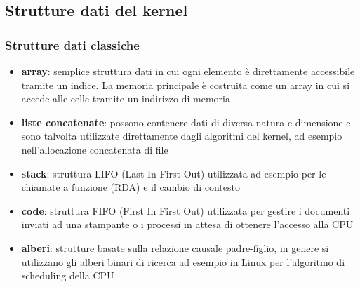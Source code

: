 \documentclass[a4paper]{article}
\begin{document}

\subsection{Strutture dati del kernel}
\subsubsection*{Strutture dati classiche}
\begin{itemize}
	\item \textbf{array}: semplice struttura dati in cui ogni elemento è direttamente accessibile tramite un indice. La
	memoria principale è costruita come un array in cui si accede alle celle tramite un indirizzo di memoria
	\item \textbf{liste concatenate}: possono contenere dati di diversa natura e dimensione e sono talvolta utilizzate
	direttamente dagli algoritmi del kernel, ad esempio nell’allocazione concatenata di file
	\item \textbf{stack}: struttura LIFO (Last In First Out) utilizzata ad esempio per le chiamate a funzione (RDA) e il
	cambio di contesto
	\item \textbf{code}: struttura FIFO (First In First Out) utilizzata per gestire i documenti inviati ad una stampante
	o i processi in attesa di ottenere l’accesso alla CPU
	\item \textbf{alberi}: strutture basate sulla relazione causale padre-figlio, in genere si utilizzano gli alberi binari
	di ricerca ad esempio in Linux per l'algoritmo di scheduling della CPU
\end{itemize}
\end{document}

